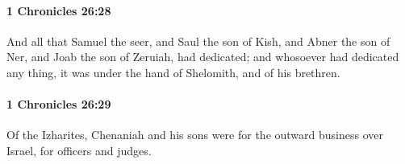 		\paragraph{1 Chronicles 26:28} %
			\label{1CHRONICLES-26-28}

			And all that Samuel the seer, and Saul the son of Kish, and Abner the son of Ner, and Joab the son of Zeruiah, had dedicated; and whosoever had dedicated any thing, it was under the hand of Shelomith, and of his brethren.


		\paragraph{1 Chronicles 26:29} %
			\label{1CHRONICLES-26-29}

			Of the Izharites, Chenaniah and his sons were for the outward business over Israel, for officers and judges.


